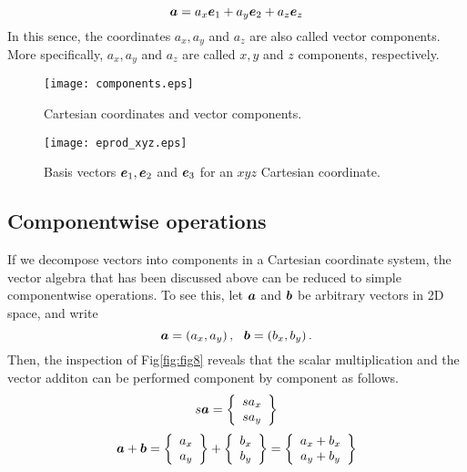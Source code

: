 \documentclass[10pt,a4j]{article}
\begin{document}
\begin{equation}
    \mbox{\boldmath $a$}=a_x\mbox{\boldmath $e$}_1+a_y\mbox{\boldmath $e$}_2+a_z\mbox{\boldmath $e$}_z
    \label{eqn:}
\end{equation}
In this sence, the coordinates $a_x, a_y$ and $a_z$ are also called vector components. More specifically, $a_x, a_y$ and $a_z$ are called $x, y$ and $z$ components, respectively.
\begin{figure}[h]
    \begin{center}
    \texttt{[image: components.eps]} 
    \end{center}
    \caption{Cartesian coordinates and vector components.} 
    \label{fig:fig6}
\end{figure}
\begin{figure}[h]
    \begin{center}
    \texttt{[image: eprod\_xyz.eps]} 
    \end{center}
    \caption{Basis vectors $\mbox{\boldmath $e$}_1, \mbox{\boldmath $e$}_2$ and $\mbox{\boldmath $e$}_3$ for an $xyz$ Cartesian coordinate.} 
    \label{fig:fig7}
\end{figure}
%
\subsection{Componentwise operations}
If we decompose vectors into components in a Cartesian coordinate system, the vector algebra that has been discussed above can be reduced to simple componentwise operations. To see this, let $\mbox{\boldmath $a$}$ and $\mbox{\boldmath $b$}$ be arbitrary vectors in 2D space, and write 
\begin{equation}
    \fat{a}=\left(a_x, a_y \right), \ \ 
    \fat{b}=\left(b_x, b_y \right).
    \label{eqn:}
\end{equation}
Then, the inspection of Fig\ref{fig:fig8} reveals that  
the scalar multiplication and the vector additon can be 
performed component by component as follows.
\begin{equation}
    s\mbox{\boldmath $a$}
    =
    \left\{
        \begin{array}{c}
            sa_x \\
            sa_y 
        \end{array}
    \right\}
    \label{eqn:}
\end{equation}
\begin{equation}
    \mbox{\boldmath $a$}
    +
    \mbox{\boldmath $b$}
    =
    \left\{
        \begin{array}{c}
            a_x \\
            a_y 
        \end{array}
    \right\}
    +
    \left\{
        \begin{array}{c}
            b_x \\
            b_y 
        \end{array}
    \right\}
    =
    \left\{
        \begin{array}{c}
            a_x+b_x \\
            a_y+b_y
        \end{array}
    \right\}
    \label{eqn:}
\end{equation}
\end{document}
